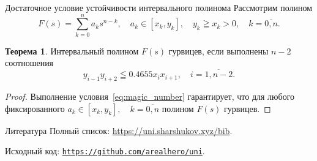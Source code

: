 \documentclass[notheorems,aspectratio=169]{beamer}
\theoremstyle{definition}
\newtheorem{theorem}{Теорема}
\begin{document}
\begin{frame}{Достаточное условие устойчивости интервального полинома}
  Рассмотрим полином
  \begin{equation}
    F(s) = \sum_{k=0}^n a_k s^{n-k}, \quad a_k \in [x_k, y_k], \quad y_k \geqq x_k > 0, \quad k = \overline{0,n}.
  \end{equation}

  \begin{theorem}
    Интервальный полином $F(s)$ гурвицев, если выполнены $n-2$ соотношения
    \begin{equation}\label{eq:magic_number}
      y_{i-1} y_{i+2} \leqq 0.4655 x_i x_{i+1}, \quad i = \overline{1,n-2}.
    \end{equation}
  \end{theorem}

  \begin{proof}
    Выполнение условия~\eqref{eq:magic_number} гарантирует, что для любого фиксированного $a_k \in [x_k, y_k], \quad k = \overline{0,n}$ полином $F(s)$ гурвицев.
  \end{proof}
\end{frame}

\begin{frame}[shrink=35]{Литература}
  \nocite{Jury1990Ru}
  \printbibliography{}
  Полный список: \url{https://uni.sharshukov.xyz/bib}.

  Исходный код:
  \href{https://github.com/arealhero/uni/blob/master/Latex/Presentations/DiscreteRobustness/DiscreteRobustness.tex}{\texttt{https://github.com/arealhero/uni}}.
\end{frame}
\end{document}
